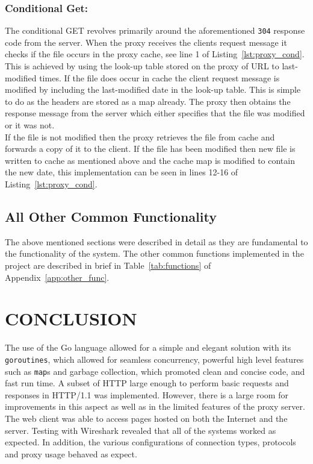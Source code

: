 \documentclass[10pt,twocolumn]{witseiepaper}
\begin{document}
		\subsubsection*{Conditional Get:} The conditional GET revolves primarily around the aforementioned \texttt{304} response code from the server. When the proxy receives the clients request message it checks if the file occurs in the proxy cache, see line 1 of Listing~\ref{lst:proxy_cond}. This is achieved by using the look-up table stored on the proxy of URL to last-modified times. If the file does occur in cache the client request message is modified by including the last-modified date in the look-up table. This is simple to do as the headers are stored as a map already. The proxy then obtains the response message from the server which either specifies that the file was modified or it was not. \\
		
		If the file is not modified then the proxy retrieves the file from cache and forwards a copy of it to the client. If the file has been modified then new file is written to cache as mentioned above and the cache map is modified to contain the new date, this implementation can be seen in lines 12-16 of Listing~\ref{lst:proxy_cond}. 
	
	\subsection{All Other Common Functionality}
	
		The above mentioned sections were described in detail as they are fundamental to the functionality of the system. The other common functions implemented in the project are described in brief in Table~\ref{tab:functions} of Appendix~\ref{app:other_func}.


\section{CONCLUSION}

 The use of the Go language allowed for a simple and elegant solution with its \texttt{goroutines}, which allowed for seamless concurrency, powerful high level features such as \texttt{map}s and garbage collection, which promoted clean and concise code, and fast run time. A subset of HTTP large enough to perform basic requests and responses in HTTP/1.1 was implemented. However, there is a large room for improvements in this aspect as well as in the limited features of the proxy server. The web client was able to access pages hosted on both the Internet and the server. Testing with Wireshark revealed that all of the systems worked as expected. In addition, the various configurations of connection types, protocols and proxy usage behaved as expect.
\end{document}
